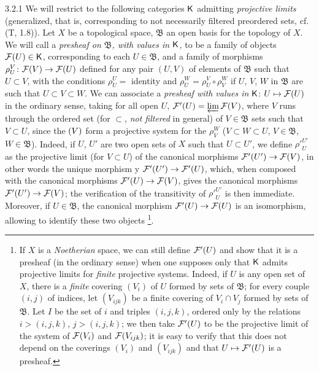 \documentclass[../main.tex]{subfiles}
\begin{document}
\begin{env}{3.2.1}
We will restrict to the following categories $\mathsf{K}$ admitting
\emph{projective limits} (generalized, that is, corresponding to not necessarily filtered preordered sets,
cf. (T, 1.8)). Let $X$ be a topological space, $\mathfrak{B}$ an open basis
for the topology of $X$. We will call a \emph{presheaf on $\mathfrak{B}$, with values in $\mathsf{K}$,} to be
a family of objects $\mathcal{F}(U)\in\mathsf{K}$, corresponding to each $U\in\mathfrak{B}$, and a family of morphisms
$\rho_U^V\colon\mathcal{F}(V)\to\mathcal{F}(U)$ defined for any pair $(U,V)$ of elements of $\mathfrak{B}$ such that $U\subset V$,
with the conditions $\rho_U^U=$ identity and $\rho_U^W=\rho_U^V\circ\rho_V^W$ if $U$, $V$, $W$ in
$\mathfrak{B}$ are such that $U\subset V\subset W$. We can associate a \emph{presheaf with values in} $\mathsf{K}$: $U\mapsto\mathcal{F}(U)$
in the ordinary sense, taking for all open $U$, $\mathcal{F}'(U)=\varprojlim\mathcal{F}(V)$, where $V$ runs through
the ordered set (for $\subset$, \emph{not filtered} in general) of $V\in\mathfrak{B}$ sets such that $V\subset U$, since
the $\mathcal(V)$ form a projective system for the $\rho_V^W$ ($V\subset W\subset U$, $V\in\mathfrak{B}$, $W\in\mathfrak{B}$).
Indeed, if $U$, $U'$ are two open sets of $X$ such that $U\subset U'$, we define ${\rho'}_U^{U'}$ as the
projective limit (for $V\subset U$) of the canonical morphisms $\mathcal{F}'(U')\to\mathcal{F}(V)$, in other words
the unique morphism y $\mathcal{F}'(U')\to\mathcal{F}'(U)$, which, when composed with the canonical morphisms
$\mathcal{F}'(U)\to\mathcal{F}(V)$, gives the canonical morphisms $\mathcal{F}'(U')\to\mathcal{F}(V)$; the verification of
the transitivity of ${\rho'}_U^{U'}$ is then immediate. Moreover, if $U\in\mathfrak{B}$,
the canonical morphism $\mathcal{F}'(U)\to\mathcal{F}(U)$ is an isomorphism, allowing to identify these two objects
\footnote{
If $X$ is a \emph{Noetherian} space, we can still define $\mathcal{F}'(U)$ and show that it is a presheaf (in the
ordinary sense) when one supposes only that $\mathsf{K}$ admits projective limits for \emph{finite} projective systems. Indeed,
if $U$ is any open set of $X$, there is a \emph{finite} covering $(V_i)$ of $U$ formed by sets of $\mathfrak{B}$; for every
couple $(i,j)$ of indices, let $(V_{ijk})$ be a finite covering of $V_i\cap V_j$ formed by sets of $\mathfrak{B}$. Let $I$ be the set
of $i$ and triples $(i,j,k)$, ordered only by the relations $i>(i,j,k)$, $j>(i,j,k)$; we then take $\mathcal{F}'(U)$ to be
the projective limit of the system of $\mathcal{F}(V_i)$ and $\mathcal{F}(V_{ijk})$; it is easy to verify that this does not depend on the
coverings $(V_i)$ and $(V_{ijk})$ and that $U\mapsto\mathcal{F}'(U)$ is a presheaf.}.
\end{env}
\end{document}
